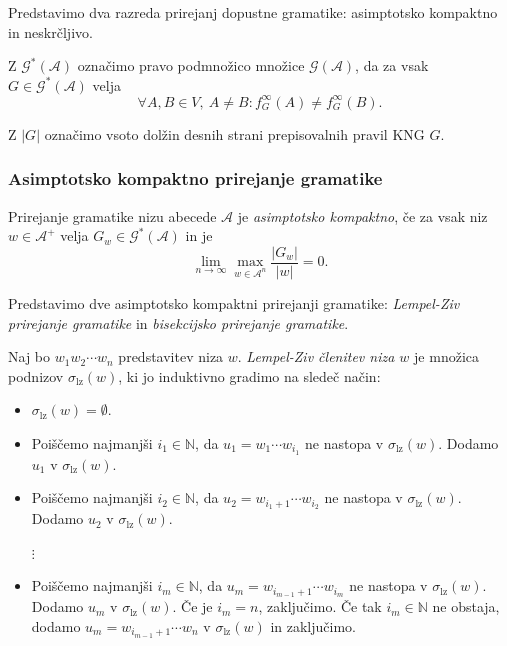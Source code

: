 \documentclass[fin1, tisk]{fmfdelo}
\providecommand{\abs}[1]{\left\lvert #1 \right\rvert}
\newcommand{\N}{\mathbb{N}}
\newcommand{\A}{\mathcal{A}}
\newcommand{\G}{\mathcal{G}}
\theoremstyle{definition}
\begin{document}
Predstavimo dva razreda prirejanj dopustne gramatike: asimptotsko kompaktno in neskrčljivo.

\begin{definicija}
    Z $\G^*(\A)$ označimo pravo podmnožico množice $\G(\A)$, da za vsak $G \in \G^*(\A)$ velja
    \[
        \forall A,B \in V, \ A \neq B \colon f_G^\infty(A) \neq f_G^\infty(B).
    \]
\end{definicija}

\begin{definicija}
    Z $\abs{G}$ označimo vsoto dolžin desnih strani prepisovalnih pravil KNG $G$.
\end{definicija}

\subsubsection{Asimptotsko kompaktno prirejanje gramatike}

\begin{definicija}
    Prirejanje gramatike nizu abecede $\A$ je \textit{asimptotsko kompaktno}, če za vsak niz
    $w \in \A^+$ velja $G_w \in \G^*(\A)$ in je
    \[
        \lim_{n \rightarrow \infty} \max_{w \in \A^n} \frac{\abs{G_w}}{\abs{w}} = 0.
    \]
\end{definicija}

Predstavimo dve asimptotsko kompaktni prirejanji gramatike: \emph{Lempel-Ziv prirejanje gramatike}
in \emph{bisekcijsko prirejanje gramatike}.

\begin{definicija}
    Naj bo $ w_1w_2 \cdots w_n$ predstavitev niza $w$. 
    \emph{Lempel-Ziv členitev niza $w$} je množica podnizov $\sigma_\text{lz}(w)$,
    ki jo induktivno gradimo na sledeč način:
    \begin{itemize}
        \item $\sigma_\text{lz}(w) = \emptyset$.
        \item Poiščemo najmanjši $i_1 \in \N$, da $u_1 = w_1 \cdots w_{i_1}$ ne nastopa v 
        $\sigma_{\text{lz}}(w)$. Dodamo $u_1$ v $\sigma_{\text{lz}}(w)$.
        \item Poiščemo najmanjši $i_2 \in \N$, da $u_2 = w_{i_1+1} \cdots w_{i_2}$ ne nastopa v 
        $\sigma_{\text{lz}}(w)$. Dodamo $u_2$ v $\sigma_{\text{lz}}(w)$. \\
        \begin{center}
        $\vdots$
        \end{center}
        \item Poiščemo najmanjši $i_{m} \in \N$, da $u_m = w_{i_{m-1}+1} \cdots w_{i_m}$
        ne nastopa v $\sigma_{\text{lz}}(w)$. Dodamo $u_m$ v $\sigma_{\text{lz}}(w)$.
        Če je $i_m = n$, zaključimo. Če tak $i_{m} \in \N$ ne obstaja, dodamo 
         $u_m = w_{i_{m-1}+1} \cdots w_n$ v $\sigma_{\text{lz}}(w)$ in zaključimo.
    \end{itemize}
\end{definicija}
\end{document}
